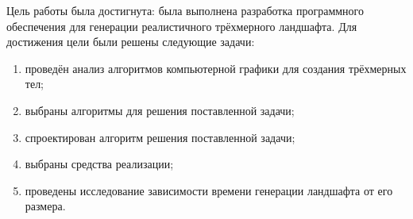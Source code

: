 
Цель работы была достигнута: была выполнена разработка программного обеспечения для генерации реалистичного трёхмерного ландшафта. Для достижения цели были решены следующие задачи:

\begin{enumerate}
	\item проведён анализ алгоритмов компьютерной графики для создания трёхмерных тел;
	\item выбраны алгоритмы для решения поставленной задачи;
	\item спроектирован алгоритм решения поставленной задачи;
	\item выбраны средства реализации;
	\item проведены исследование зависимости времени генерации ландшафта от его размера.
\end{enumerate}